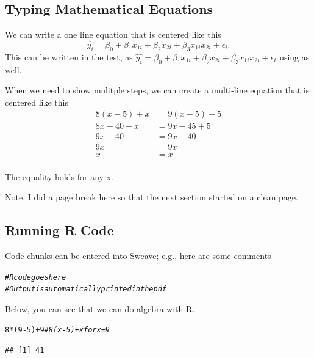 \documentclass{article}\usepackage[]{graphicx}\usepackage[]{xcolor}
\makeatletter
\newcommand{\hlnum}[1]{\textcolor[rgb]{0.686,0.059,0.569}{#1}}%
\newcommand{\hlcom}[1]{\textcolor[rgb]{0.678,0.584,0.686}{\textit{#1}}}%
\newcommand{\hlopt}[1]{\textcolor[rgb]{0,0,0}{#1}}%
\newcommand{\hldef}[1]{\textcolor[rgb]{0.345,0.345,0.345}{#1}}%
\newenvironment{kframe}{%
 \def\at@end@of@kframe{}%
 \ifinner\ifhmode%
  \def\at@end@of@kframe{\end{minipage}}%
  \begin{minipage}{\columnwidth}%
 \fi\fi%
 \def\FrameCommand##1{\hskip\@totalleftmargin \hskip-\fboxsep
 \colorbox{shadecolor}{##1}\hskip-\fboxsep
     \hskip-\linewidth \hskip-\@totalleftmargin \hskip\columnwidth}%
 \MakeFramed {\advance\hsize-\width
   \@totalleftmargin\z@ \linewidth\hsize
   \@setminipage}}%
 {\par\unskip\endMakeFramed%
 \at@end@of@kframe}
\newenvironment{knitrout}{}{} %
\makeatother
\begin{document}
\begin{multicols}{2}
\subsection{Typing Mathematical Equations}
\noindent We can write a one line equation that is centered like this
\[\widehat{y_i} = \beta_0 + \beta_1 x_{1i} + \beta_2 x_{2i} + \beta_3 x_{1i} x_{2i} + \epsilon_i.\]
\noindent This can be written in the test, as $\widehat{y_i} = \beta_0 + \beta_1 x_{1i} + \beta_2 x_{2i} + \beta_3 x_{1i} x_{2i} + \epsilon_i$ using as well.

When we need to show mulitple steps, we can create a multi-line equation that is centered like this
\begin{align*}
8(x-5)+x&=9(x-5)+5 \\
8x-40+x&=9x-45+5 \tag{Distribution)} \\
9x-40&=9x-40 \tag{Combining like terms} \\
9x&=9x \tag{adding 40 to both sides} \\
x&=x \tag{Dividing bohth sides by 9} \\
\end{align*}

\noindent The equality holds for any x.

Note, I did a page break here so that the next section started on a clean page. \newpage

\subsection{Running R Code}
Code chunks can be entered into Sweave; e.g., here are some comments
\begin{knitrout}\scriptsize
{}\color{fgcolor}\begin{kframe}
\begin{alltt}
\hlcom{# R code goes here}
\hlcom{# Output is automatically printed in the pdf}
\end{alltt}
\end{kframe}
\end{knitrout}

Below, you can see that we can do algebra with R.
\begin{knitrout}\scriptsize
{}\color{fgcolor}\begin{kframe}
\begin{alltt}
\hlnum{8}\hlopt{*}\hldef{(}\hlnum{9}\hlopt{-}\hlnum{5}\hldef{)} \hlopt{+} \hlnum{9} \hlcom{# 8(x-5) + x for x=9}
\end{alltt}
\begin{verbatim}
## [1] 41
\end{verbatim}
\end{kframe}
\end{knitrout}


\end{multicols}
\end{document}
